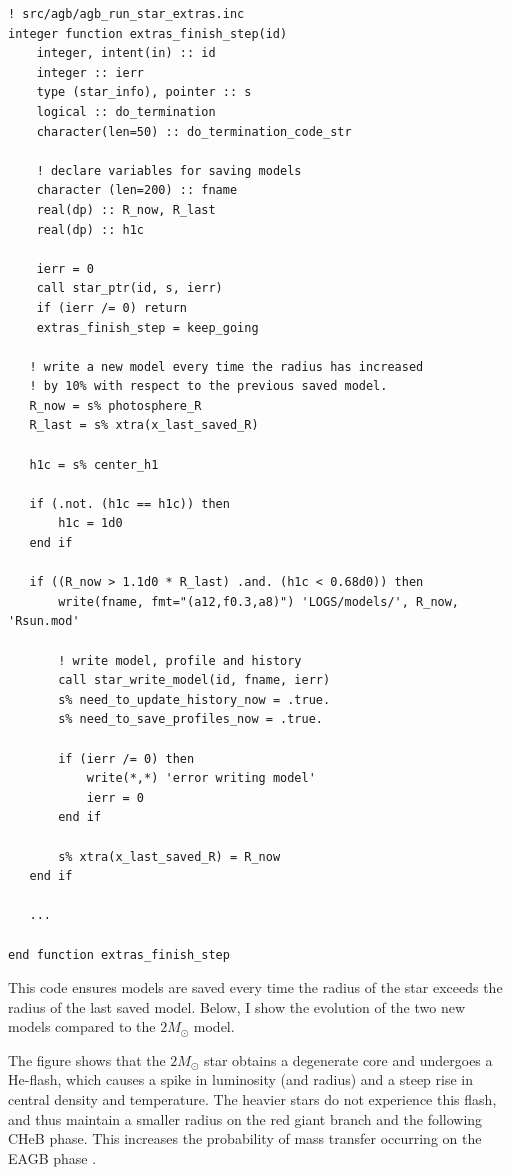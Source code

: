 \documentclass[a4paper,10pt]{article}
\begin{document}
    \begin{verbatim}
! src/agb/agb_run_star_extras.inc
integer function extras_finish_step(id)
    integer, intent(in) :: id
    integer :: ierr
    type (star_info), pointer :: s
    logical :: do_termination
    character(len=50) :: do_termination_code_str

    ! declare variables for saving models
    character (len=200) :: fname
    real(dp) :: R_now, R_last
    real(dp) :: h1c

    ierr = 0
    call star_ptr(id, s, ierr)
    if (ierr /= 0) return
    extras_finish_step = keep_going

   ! write a new model every time the radius has increased 
   ! by 10% with respect to the previous saved model.
   R_now = s% photosphere_R
   R_last = s% xtra(x_last_saved_R)

   h1c = s% center_h1

   if (.not. (h1c == h1c)) then
       h1c = 1d0
   end if

   if ((R_now > 1.1d0 * R_last) .and. (h1c < 0.68d0)) then
       write(fname, fmt="(a12,f0.3,a8)") 'LOGS/models/', R_now, 'Rsun.mod'

       ! write model, profile and history
       call star_write_model(id, fname, ierr)
       s% need_to_update_history_now = .true.
       s% need_to_save_profiles_now = .true.

       if (ierr /= 0) then
           write(*,*) 'error writing model'
           ierr = 0
       end if

       s% xtra(x_last_saved_R) = R_now
   end if 

   ...

end function extras_finish_step
    \end{verbatim}
    This code ensures models are saved every time the radius of the star exceeds the radius of the last saved model.
    Below, I show the evolution of the two new models compared to the \(2M_\odot \) model.

    \begin{figure}[ht]
        \centering
    \end{figure}

    The figure shows that the \(2M_\odot \) star obtains a degenerate core and undergoes a He-flash, which causes a spike in luminosity (and radius) and a steep rise in central density and temperature. The heavier stars do not experience this flash, and thus maintain a smaller radius on the red giant branch and the following CHeB phase. This increases the probability of mass transfer occurring on the EAGB phase .
\end{document}
